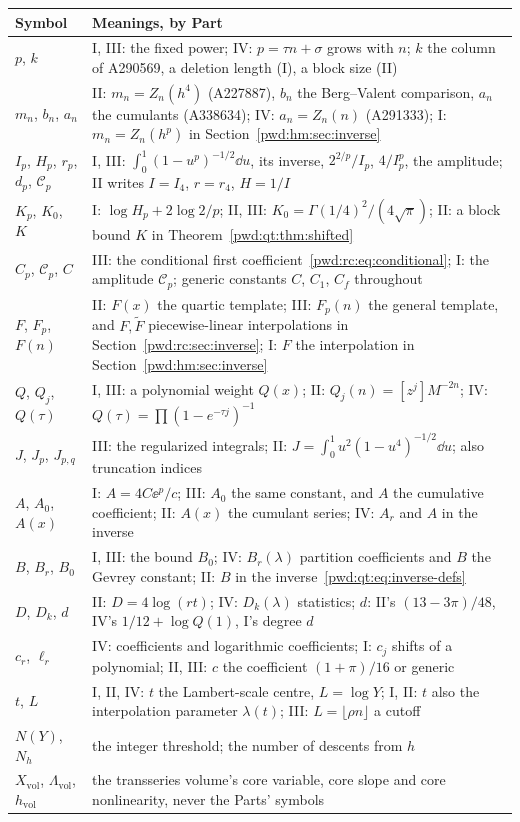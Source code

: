 \documentclass[11pt,letterpaper]{article}
\numberwithin{equation}{section}
\theoremstyle{remark}\newtheorem{remark}[theorem]{Remark}
\newcommand{\vol}{\mathrm{vol}}
\begin{document}
\begin{longtable}{@{}>{\raggedright\arraybackslash}p{0.75in}>{\raggedright\arraybackslash}p{5.25in}@{}}
\toprule
Symbol & Meanings, by Part\\
\midrule
\endhead
$p$, $k$ & I, III: the fixed power; IV: $p=\tau n+\sigma$ grows with $n$; $k$ the column of A290569, a deletion length (I), a block size (II)\\
$m_n$, $b_n$, $a_n$ & II: $m_n=Z_n(h^4)$ (A227887), $b_n$ the Berg--Valent comparison, $a_n$ the cumulants (A338634); IV: $a_n=Z_n(n)$ (A291333); I: $m_n=Z_n(h^p)$ in Section~\ref{pwd:hm:sec:inverse}\\
$I_p$, $H_p$, $r_p$, $d_p$, $\mathcal C_p$ & I, III: $\int_0^1(1-u^p)^{-1/2}\dd u$, its inverse, $2^{2/p}/I_p$, $4/I_p^p$, the amplitude; II writes $I=I_4$, $r=r_4$, $H=1/I$\\
$K_p$, $K_0$, $K$ & I: $\log H_p+2\log2/p$; II, III: $K_0=\Gamma(1/4)^2/(4\sqrt\pi)$; II: a block bound $K$ in Theorem~\ref{pwd:qt:thm:shifted}\\
$C_p$, $\mathcal C_p$, $C$ & III: the conditional first coefficient~\eqref{pwd:rc:eq:conditional}; I: the amplitude $\mathcal C_p$; generic constants $C$, $C_1$, $C_f$ throughout\\
$F$, $F_p$, $F(n)$ & II: $F(x)$ the quartic template; III: $F_p(n)$ the general template, and $F,\widetilde F$ piecewise-linear interpolations in Section~\ref{pwd:rc:sec:inverse}; I: $F$ the interpolation in Section~\ref{pwd:hm:sec:inverse}\\
$Q$, $Q_j$, $Q(\tau)$ & I, III: a polynomial weight $Q(x)$; II: $Q_j(n)=[z^j]M^{-2n}$; IV: $Q(\tau)=\prod(1-e^{-\tau j})^{-1}$\\
$J$, $J_p$, $J_{p,q}$ & III: the regularized integrals; II: $J=\int_0^1u^2(1-u^4)^{-1/2}\dd u$; also truncation indices\\
$A$, $A_0$, $A(x)$ & I: $A=4C\ee^p/c$; III: $A_0$ the same constant, and $A$ the cumulative coefficient; II: $A(x)$ the cumulant series; IV: $A_r$ and $A$ in the inverse\\
$B$, $B_r$, $B_0$ & I, III: the bound $B_0$; IV: $B_r(\lambda)$ partition coefficients and $B$ the Gevrey constant; II: $B$ in the inverse~\eqref{pwd:qt:eq:inverse-defs}\\
$D$, $D_k$, $d$ & II: $D=4\log(rt)$; IV: $D_k(\lambda)$ statistics; $d$: II's $(13-3\pi)/48$, IV's $1/12+\log Q(1)$, I's degree $d$\\
$c_r$, $\ell_r$ & IV: coefficients and logarithmic coefficients; I: $c_j$ shifts of a polynomial; II, III: $c$ the coefficient $(1+\pi)/16$ or generic\\
$t$, $L$ & I, II, IV: $t$ the Lambert-scale centre, $L=\log Y$; I, II: $t$ also the interpolation parameter $\lambda(t)$; III: $L=\lfloor\rho n\rfloor$ a cutoff\\
$N(Y)$, $N_h$ & the integer threshold; the number of descents from $h$\\
$X_\vol$, $\Lambda_\vol$, $h_\vol$ & the transseries volume's core variable, core slope and core nonlinearity, never the Parts' symbols\\
\bottomrule
\end{longtable}
\end{document}
